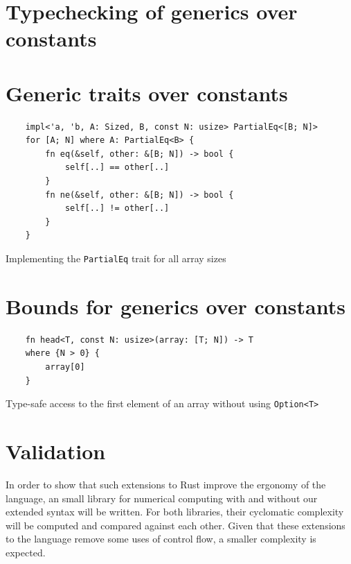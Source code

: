 \section{Typechecking of generics over constants}

\section{Generic traits over constants}

\begin{listing}[ht]
	\begin{verbatim}
    impl<'a, 'b, A: Sized, B, const N: usize> PartialEq<[B; N]> 
    for [A; N] where A: PartialEq<B> {
        fn eq(&self, other: &[B; N]) -> bool {
            self[..] == other[..]
        }
        fn ne(&self, other: &[B; N]) -> bool {
            self[..] != other[..]
        }
    }
	\end{verbatim}
    \caption{Implementing the \texttt{PartialEq} trait for all array sizes}
  \label{lst:trait_const_generics}
\end{listing}

\section{Bounds for generics over constants}

\begin{listing}[ht]
	\begin{verbatim}
    fn head<T, const N: usize>(array: [T; N]) -> T
    where {N > 0} {
        array[0]
    }
    \end{verbatim}
    \caption{Type-safe access to the first element of an array without using
    \texttt{Option<T>}}
  \label{lst:head_const_generics}
\end{listing}
\section{Validation}

In order to show that such extensions to Rust improve the ergonomy of the
language, an small library for numerical computing with and without our extended
syntax will be written. For both libraries, their cyclomatic complexity will be
computed and compared against each other. Given that these extensions to the
language remove some uses of control flow, a smaller complexity is expected.
